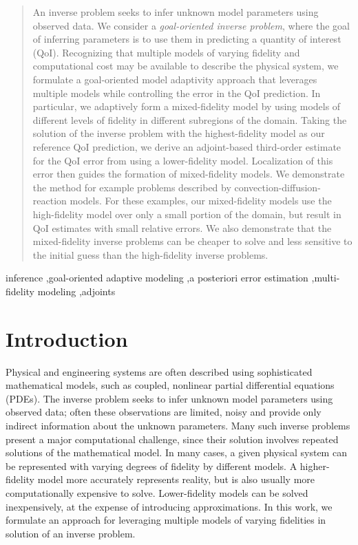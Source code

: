 \documentclass[review,sort&compress]{elsarticle}
\begin{document}
\begin{frontmatter}
\begin{abstract}
An inverse problem seeks to infer unknown model parameters using observed data. We consider a \textit{goal-oriented inverse problem}, where the goal of inferring parameters is to use them in predicting a quantity of interest (QoI). Recognizing that multiple models of varying fidelity and computational cost may be available to describe the physical system, we formulate a goal-oriented model adaptivity approach that leverages multiple models while controlling the error in the QoI prediction. In particular, we adaptively form a mixed-fidelity model by using models of different levels of fidelity in different subregions of the domain. Taking the solution of the inverse problem with the highest-fidelity model as our reference QoI prediction, we derive an adjoint-based third-order estimate for the QoI error from using a lower-fidelity model. Localization of this error then guides the formation of mixed-fidelity models. We demonstrate the method for example problems described by convection-diffusion-reaction models. For these examples, our mixed-fidelity models use the high-fidelity model over only a small portion of the domain, but result in QoI estimates with small relative errors. We also demonstrate that the mixed-fidelity inverse problems can be cheaper to solve and less sensitive to the initial guess than the high-fidelity inverse problems.


\end{abstract}

\begin{keyword}
  inference \sep goal-oriented adaptive modeling \sep a posteriori error estimation \sep multi-fidelity modeling \sep adjoints
\end{keyword}

\end{frontmatter}


\section{Introduction}

Physical and engineering systems are often described using sophisticated mathematical models, such as coupled, nonlinear partial differential equations (PDEs). The inverse problem seeks to infer unknown model parameters using observed data; often these observations are limited, noisy and provide only indirect information about the unknown parameters. Many such inverse problems present a major computational challenge, since their solution involves repeated solutions of the mathematical model. In many cases, a given physical system can be represented with varying degrees of fidelity by different models. A higher-fidelity model more accurately represents reality, but is also usually more computationally expensive to solve. Lower-fidelity models can be solved inexpensively, at the expense of introducing approximations. In this work, we formulate an approach for leveraging multiple models of varying fidelities in solution of an inverse problem.
\end{document}
